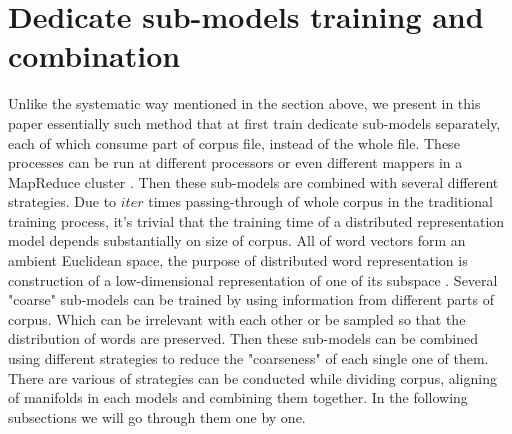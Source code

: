 \section{Dedicate sub-models training and combination}
Unlike the systematic way mentioned in the section above, we present in this paper essentially such method that at first train dedicate sub-models separately, each of which consume part of corpus file, instead of the whole file. These processes can be run at different processors or even different mappers in a MapReduce cluster \cite{dean2008mapreduce}. Then these sub-models are combined with several different strategies. Due to $iter$ times passing-through of whole corpus in the traditional training process, it's trivial that the training time of a distributed representation model depends substantially on size of corpus. All of word vectors form an ambient Euclidean space, the purpose of distributed word representation is construction of a low-dimensional representation of one of its subspace \cite{Mahadevan2015reasoning}. Several "coarse" sub-models can be trained by using information from different parts of corpus. Which can be irrelevant with each other or be sampled so that the distribution of words are preserved. Then these sub-models can be combined using different strategies to reduce the "coarseness" of each single one of them. There are various of strategies can be conducted while dividing corpus, aligning of manifolds in each models and combining them together. In the following subsections we will go through them one by one.






